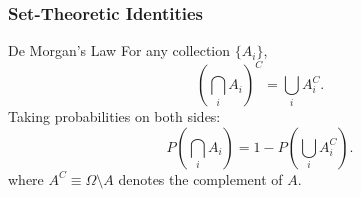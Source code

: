 \subsubsection{Set-Theoretic Identities}
\begin{prop}{De Morgan's Law}
For any collection \( \{A_i\} \),
\[
\left( \bigcap_i A_i \right)^C = \bigcup_i A_i^C.
\]
Taking probabilities on both sides:
\[
P\left( \bigcap_i A_i \right) = 1 - P\left( \bigcup_i A_i^C \right).
\]
where \( A^C \equiv \Omega \setminus A \) denotes the complement of \( A \).
\end{prop}

%
%    


